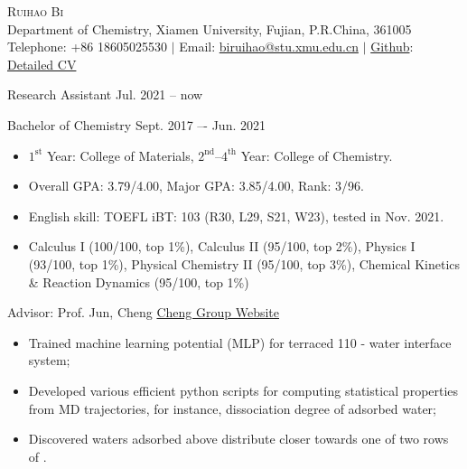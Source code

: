 \pagestyle{plain}
\thispagestyle{empty} %
\begin{center}
    \Large{\textsc{Ruihao Bi}} \\ 
    \normalsize {Department of Chemistry, Xiamen University, Fujian, P.R.China, 361005} \\ 
    Telephone: {+86 18605025530} $|$ 
    Email: {\href{mailto:biruihao@stu.xmu.edu.cn}{biruihao@stu.xmu.edu.cn}} $|$ 
    \href{https://github.com/ruihao69}{Github}: \href{https://github.com/ruihao69/brh-cv}{Detailed CV}  \\
\end{center}

\sectionrule
{}

\noindent Research Assistant \hfill {Jul. 2021 -- now}

\noindent Bachelor of Chemistry \hfill {Sept. 2017 –- Jun. 2021}

\begin{itemize}
    \item $\mathrm{1^{st}}$ Year: College of Materials, $\mathrm{2^{nd}}$--$\mathrm{4^{th}}$ Year: College of Chemistry.
    \item Overall GPA: 3.79/4.00, Major GPA: 3.85/4.00, Rank: 3/96.
    \item English skill: TOEFL iBT: 103 (R30, L29, S21, W23), tested in Nov. 2021.
\end{itemize}



\noindent{}
\begin{itemize}
    \item Calculus I (100/100, top 1\%), Calculus II (95/100, top 2\%), Physics I (93/100, top 1\%), Physical Chemistry II (95/100, top 3\%), Chemical Kinetics \& Reaction Dynamics (95/100, top 1\%)
\end{itemize}

\vspace{5mm}
\sectionrule



{\noindent Advisor: Prof. Jun, Cheng  \hfill \href{https://chengjun.xmu.edu.cn/}{Cheng Group Website}}


\begin{itemize}
    \item Trained machine learning potential (MLP) for terraced  110 - water interface system;
    \item Developed various efficient python scripts for computing statistical properties from MD trajectories, for instance, dissociation degree of adsorbed water;
    \item Discovered waters adsorbed above  distribute closer towards one of two rows of .
\end{itemize}

